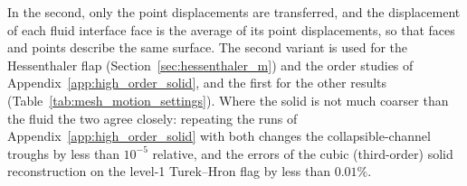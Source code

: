 In the second, only the point displacements are transferred, and the displacement of each fluid interface face is the average of its point displacements, so that faces and points describe the same surface.
The second variant is used for the Hessenthaler flap (Section~\ref{sec:hessenthaler_m}) and the order studies of Appendix~\ref{app:high_order_solid}, and the first for the other results (Table~\ref{tab:mesh_motion_settings}).
Where the solid is not much coarser than the fluid the two agree closely: repeating the runs of Appendix~\ref{app:high_order_solid} with both changes the collapsible-channel troughs by less than $10^{-5}$ relative, and the errors of the cubic (third-order) solid reconstruction on the level-1 Turek--Hron flag by less than $0.01\%$.

